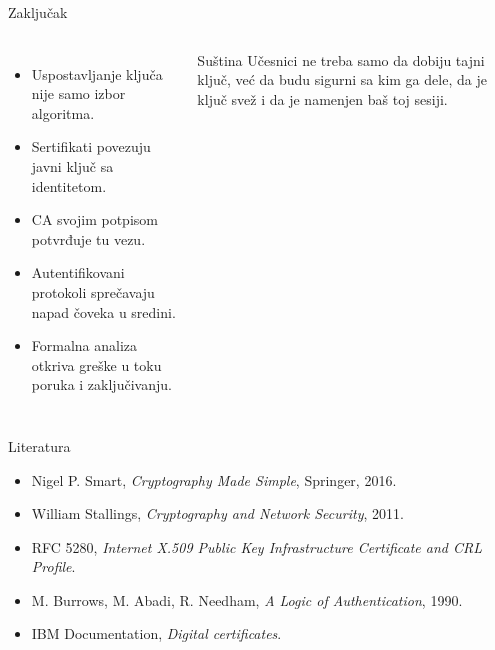 \documentclass[aspectratio=1610]{beamer}
\begin{document}
\begin{frame}[t]{Zaključak}
\small
\begin{columns}[T,onlytextwidth]
\begin{itemize}
    \item Uspostavljanje ključa nije samo izbor algoritma.
    \item Sertifikati povezuju javni ključ sa identitetom.
    \item CA svojim potpisom potvrđuje tu vezu.
    \item Autentifikovani protokoli sprečavaju napad čoveka u sredini.
    \item Formalna analiza otkriva greške u toku poruka i zaključivanju.
\end{itemize}

\begin{alertblock}{Suština}
Učesnici ne treba samo da dobiju tajni ključ, već da budu sigurni sa kim ga dele, da je ključ svež i da je namenjen baš toj sesiji.
\end{alertblock}
\end{columns}
\end{frame}

\begin{frame}[t]{Literatura}
\small
\begin{itemize}
    \item Nigel P. Smart, \emph{Cryptography Made Simple}, Springer, 2016.
    \item William Stallings, \emph{Cryptography and Network Security}, 2011.
    \item RFC 5280, \emph{Internet X.509 Public Key Infrastructure Certificate and CRL Profile}.
    \item M. Burrows, M. Abadi, R. Needham, \emph{A Logic of Authentication}, 1990.
    \item IBM Documentation, \emph{Digital certificates}.
\end{itemize}
\end{frame}
\end{document}
